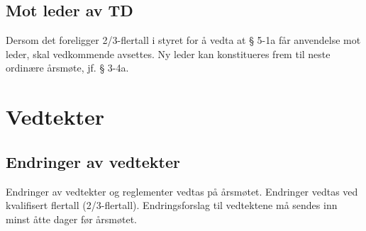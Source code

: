 \documentclass[11pt]{article}
\begin{document}
\subsection{Mot leder av TD}
Dersom det foreligger 2/3-flertall i styret for å vedta at § 5-1a får anvendelse mot leder, skal vedkommende avsettes. Ny leder kan konstitueres frem til neste ordinære årsmøte, jf. § 3-4a.

\section{Vedtekter}
\subsection{Endringer av vedtekter}
Endringer av vedtekter og reglementer vedtas på årsmøtet. Endringer vedtas ved kvalifisert flertall (2/3-flertall). Endringsforslag til vedtektene må sendes inn minst åtte dager før årsmøtet.
\end{document}
